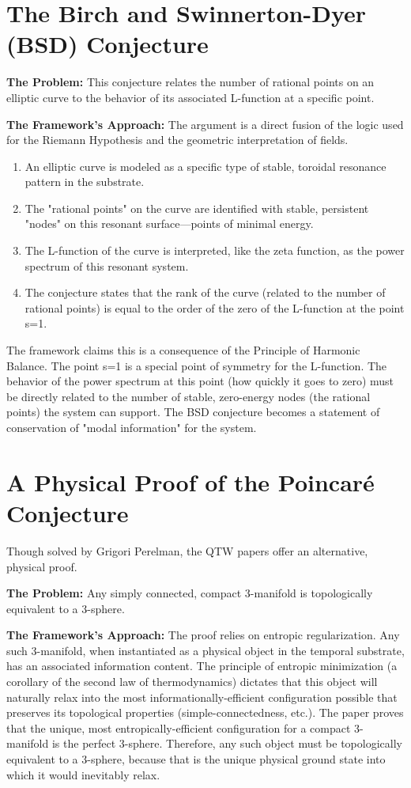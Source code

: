 \documentclass[12pt]{report}
\begin{document}
\section{The Birch and Swinnerton-Dyer (BSD) Conjecture}
\textbf{The Problem:} This conjecture relates the number of rational points on an elliptic curve to the behavior of its associated L-function at a specific point.

\textbf{The Framework's Approach:} The argument is a direct fusion of the logic used for the Riemann Hypothesis and the geometric interpretation of fields.
\begin{enumerate}
    \item An elliptic curve is modeled as a specific type of stable, toroidal resonance pattern in the substrate.
    \item The "rational points" on the curve are identified with stable, persistent "nodes" on this resonant surface—points of minimal energy.
    \item The L-function of the curve is interpreted, like the zeta function, as the power spectrum of this resonant system.
    \item The conjecture states that the rank of the curve (related to the number of rational points) is equal to the order of the zero of the L-function at the point s=1.
\end{enumerate}
The framework claims this is a consequence of the Principle of Harmonic Balance. The point s=1 is a special point of symmetry for the L-function. The behavior of the power spectrum at this point (how quickly it goes to zero) must be directly related to the number of stable, zero-energy nodes (the rational points) the system can support. The BSD conjecture becomes a statement of conservation of "modal information" for the system.

\section{A Physical Proof of the Poincaré Conjecture}
Though solved by Grigori Perelman, the QTW papers offer an alternative, physical proof.

\textbf{The Problem:} Any simply connected, compact 3-manifold is topologically equivalent to a 3-sphere.

\textbf{The Framework's Approach:} The proof relies on entropic regularization. Any such 3-manifold, when instantiated as a physical object in the temporal substrate, has an associated information content. The principle of entropic minimization (a corollary of the second law of thermodynamics) dictates that this object will naturally relax into the most informationally-efficient configuration possible that preserves its topological properties (simple-connectedness, etc.). The paper proves that the unique, most entropically-efficient configuration for a compact 3-manifold is the perfect 3-sphere. Therefore, any such object must be topologically equivalent to a 3-sphere, because that is the unique physical ground state into which it would inevitably relax.
\end{document}
